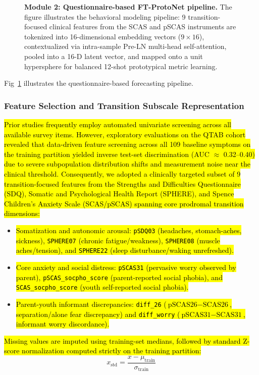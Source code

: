 \documentclass[10pt,letterpaper]{article}
\begin{document}
        \begin{figure}[!h]
        \caption{\textbf{Module 2: Questionnaire-based FT-ProtoNet pipeline.}
        The figure illustrates the behavioral modeling pipeline: 9 transition-focused clinical features from the SCAS and pSCAS instruments are tokenized into 16-dimensional embedding vectors ($9 \times 16$), contextualized via intra-sample Pre-LN multi-head self-attention, pooled into a 16-D latent vector, and mapped onto a unit hypersphere for balanced 12-shot prototypical metric learning.}
        \label{fig:module2}
        \end{figure}

        Fig~\ref{fig:module2} illustrates the questionnaire-based forecasting pipeline.

        \subsubsection*{\textbf{Feature Selection and Transition Subscale Representation}}
        \hl{Prior studies frequently employ automated univariate screening across all available survey items. However, exploratory evaluations on the QTAB cohort revealed that data-driven feature screening across all 109 baseline symptoms on the training partition yielded inverse test-set discrimination (AUC $\approx$ 0.32--0.40) due to severe subpopulation distribution shifts and measurement noise near the clinical threshold. Consequently, we adopted a clinically targeted subset of 9 transition-focused features from the Strengths and Difficulties Questionnaire (SDQ), Somatic and Psychological Health Report (SPHERE), and Spence Children's Anxiety Scale (SCAS/pSCAS) spanning core prodromal transition dimensions:}
        \begin{itemize}
            \item \hl{Somatization and autonomic arousal: \texttt{pSDQ03} (headaches, stomach-aches, sickness), \texttt{SPHERE07} (chronic fatigue/weakness), \texttt{SPHERE08} (muscle aches/tension), and \texttt{SPHERE22} (sleep disturbance/waking unrefreshed).}
            \item \hl{Core anxiety and social distress: \texttt{pSCAS31} (pervasive worry observed by parent), \texttt{pSCAS\_socpho\_score} (parent-reported social phobia), and \texttt{SCAS\_socpho\_score} (youth self-reported social phobia).}
            \item \hl{Parent-youth informant discrepancies: \texttt{diff\_26} ($\text{pSCAS26} - \text{SCAS26}$, separation/alone fear discrepancy) and \texttt{diff\_worry} ($\text{pSCAS31} - \text{SCAS31}$, informant worry discordance).}
        \end{itemize}
        \hl{Missing values are imputed using training-set medians, followed by standard Z-score normalization computed strictly on the training partition:}
        \begin{equation} \label{eq_rob:2}
        x_{\text{std}} = \frac{x - \mu_{\text{train}}}{\sigma_{\text{train}}}
        \end{equation}
\end{document}
